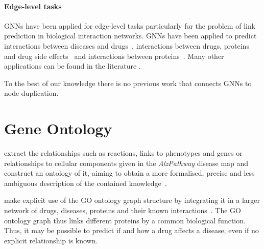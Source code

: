 \documentclass[
	fontsize=10pt, %
	twoside=true, %
	secnumdepth=1, %
  toc=indentunnumbered %
]{kaobook}
\begin{document}


\paragraph{Edge-level tasks} GNNs have been applied for edge-level tasks
particularly for the problem of link prediction in biological interaction
networks. GNNs have been applied to predict interactions between diseases and
drugs~\cite{bajaj_GraphConvolutionalNetworks_2017}, interactions between drugs,
proteins and drug side effects~\cite{zitnik_modeling_2018} and interactions
between proteins~\cite{chereda_ExplainingDecisionsGraph_2021}. Many other
applications can be found in the literature
\cite{zhang_GraphNeuralNetworks_2021}.



To the best of our knowledge there is no previous work that connects GNNs to
node duplication.




\section{Gene Ontology}
\label{sec:gene-ontology-related}

\citeauthor{henry_ConvertingDiseaseMaps_2021} extract the relationships such as
reactions, links to phenotypes and genes or relationships to cellular components
given in the \textit{AlzPathway} disease map and construct an ontology of it,
aiming to obtain a more formalised, precise and less ambiguous description of
the contained knowledge~\cite{henry_ConvertingDiseaseMaps_2021}.

\citeauthor{ruiz_identification_2021} make explicit use of the GO ontology graph
structure by integrating it in a larger network of drugs, diseases, proteins and
their known interactions~\cite{ruiz_identification_2021}. The GO ontology graph
thus links different proteins by a common biological function. Thus, it may be
possible to predict if and how a drug affects a disease, even if no explicit
relationship is known.
\end{document}
